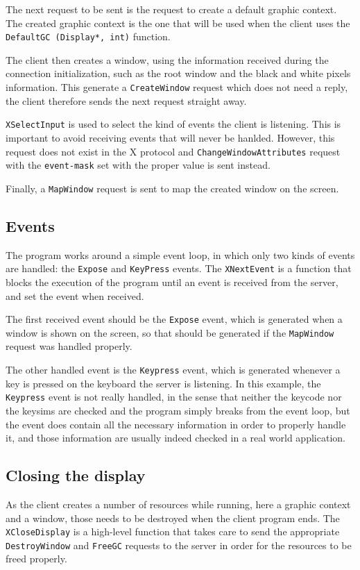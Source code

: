 The next request to be sent is the request to create a default graphic context. 
The created graphic context is the one that will be used when the client uses the 
\lstinline{DefaultGC (Display*, int)} function.

The client then creates a window, using the information received during the connection 
initialization, such as the root window and the black and white pixels information. This 
generate a \lstinline{CreateWindow} request which does not need a reply, the client therefore 
sends the next request straight away. 

\lstinline{XSelectInput} is used to select the kind of events the client is listening. 
This is important to avoid receiving events that will never be hanlded. However, this request does 
not exist in the X protocol and \lstinline{ChangeWindowAttributes} request with the 
\lstinline{event-mask} set with the proper value is sent instead.

Finally, a \lstinline{MapWindow} request is sent to map the created window on the screen.
%
\subsection{Events}
The program works around a simple event loop, in which only two kinds of events are 
handled: the \lstinline{Expose} and \lstinline{KeyPress} events. 
The \lstinline{XNextEvent} is a function that blocks the execution of the program 
until an event is received from the server, and set the event when received.

The first received event should be the \lstinline{Expose} event, which is generated when
a window is shown on the screen, so that should be generated if the \lstinline{MapWindow} request 
was handled properly.

The other handled event is the \lstinline{Keypress} event, which is generated whenever 
a key is pressed on the keyboard the server is listening. In this example, 
the \lstinline{Keypress} event is not really handled, in the sense that neither the keycode nor 
the keysims are checked and the program simply breaks from the event loop, but the event does 
contain all the necessary information in order to properly handle it, and those information 
are usually indeed checked in a real world application.
%
\subsection{Closing the display}
As the client creates a number of resources while running, here a graphic context and a window, 
those needs to be destroyed when the client program ends. The \lstinline{XCloseDisplay} is 
a high-level function that takes care to send the appropriate \lstinline{DestroyWindow} and 
\lstinline{FreeGC} requests to the server in order for the resources to be freed properly.
